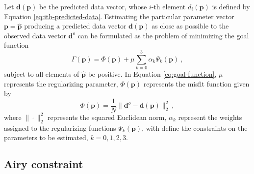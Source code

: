 \documentclass[manuscript]{geophysics}
\begin{document}
Let $\mathbf{d}(\mathbf{p})$ be the predicted data vector, whose $i$-th element
$d_{i}(\mathbf{p})$ is defined by Equation \ref{eq:ith-predicted-data}. Estimating the
particular parameter vector $\mathbf{p} = \hat{\mathbf{p}}$ producing a predicted data
vector $\mathbf{d}(\mathbf{p})$ as close as possible to the observed data vector 
$\mathbf{d}^{o}$ can be formulated as the problem of minimizing the goal function
\begin{equation}
\Gamma (\mathbf{p}) = \Phi(\mathbf{p}) + \mu \sum_{k = 0}^{3} \alpha_{k}
\Psi_{k}(\mathbf{p}) \: ,
\label{eq:goal-function}
\end{equation}
subject to all elements of $\hat{\mathbf{p}}$ be positive. In Equation
\ref{eq:goal-function}, $\mu$ represents the regularizing parameter, $\Phi(\mathbf{p})$
represents the misfit function given by
\begin{equation}
\Phi(\mathbf{p}) = \frac{1}{N} \| \mathbf{d}^{o} - \mathbf{d}(\mathbf{p}) \|_{2}^{2} 
\: , 
\label{eq:misfit-function}
\end{equation}
where $\| \cdot \|_{2}^{2}$ represents the squared Euclidean norm, $\alpha_{k}$
represent the weights assigned to the regularizing functions $\Psi_{k}(\mathbf{p})$,
with define the constraints on the parameters to be estimated, $k = 0, 1, 2, 3$.

\subsection{Airy constraint}
\end{document}
